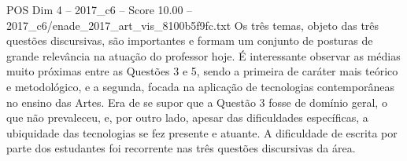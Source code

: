 \begin{textsample}{POS Dim 4 – 2017\_c6 – Score 10.00 – 2017\_c6/enade\_2017\_art\_vis\_8100b5f9fc.txt}
Os três temas, objeto das três questões discursivas, são importantes e formam um conjunto de posturas de grande relevância na atuação do professor hoje.
É interessante observar as médias muito próximas entre as Questões 3 e 5, sendo a primeira de caráter mais teórico e metodológico, e a segunda, focada na aplicação de tecnologias contemporâneas no ensino das Artes.
Era de se supor que a Questão 3 fosse de domínio geral, o que não prevaleceu, e, por outro lado, apesar das dificuldades específicas, a ubiquidade das tecnologias se fez presente e atuante.
A dificuldade de escrita por parte dos estudantes foi recorrente nas três questões discursivas da área.

\end{textsample}
